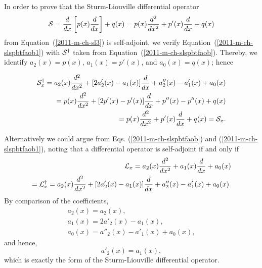 {\color{OliveGreen}
\bproof

In order to prove that the  Sturm-Liouville differential operator
\begin{equation}
\begin{split}
{\cal S}
=       \frac{d}{dx}
\left[
p(x)
\frac{d}{dx}
\right]
+
q(x)
= p(x) \frac{d^2}{dx^2}
+p'(x) \frac{d}{dx}
+q(x)
\end{split}
\label{2011-m-ch-slspbtfaoc}
\end{equation}
from Equation~(\ref{2011-m-ch-sl3})
is self-adjoint, we verify
Equation~(\ref{2011-m-ch-slspbtfaob1})
with
${\cal S}^\dagger$
taken from
Equation~(\ref{2011-m-ch-slspbtfaob}).
Thereby, we identify
$a_2(x) = p(x)$,
$a_1(x) = p'(x)$,
and
$a_0(x) = q(x)$; hence

\begin{equation}
\begin{split}
{\cal S}_x^\dagger
=a_2(x) \frac{d^2}{dx^2}
+
[2 a'_2(x)- a_1(x) ]  \frac{d}{dx}
+ a''_2(x)   - a'_1(x)   + a_0(x) \\
  =
p(x)  \frac{d^2}{dx^2}
+ [2 p'(x)-p'(x)] \frac{d}{dx}
+p''(x)-p''(x)+q(x) \\
  =
p(x)  \frac{d^2}{dx^2}
+ p'(x) \frac{d}{dx}
+q(x)  = {\cal S}_x
.
\end{split}
\end{equation}

Alternatively we could argue from Eqs. (\ref{2011-m-ch-slspbtfaob}) and (\ref{2011-m-ch-slspbtfaob1}),
noting that
a differential operator is self-adjoint if and only if
\begin{equation}
\begin{split}
 {\cal L}_x
=a_2(x) \frac{d^2}{dx^2}   +  a_1(x)\frac{d }{dx }    + a_0(x) \\
=   {\cal L}_x^\dagger =
 a_2(x) \frac{d^2}{dx^2}
+
[2 a'_2(x)- a_1(x) ]  \frac{d}{dx}
+ a''_2(x)   - a'_1(x)   + a_0(x)
.
\end{split}
\end{equation}
By comparison of the coefficients,
\begin{equation}
\begin{split}
a_2(x)=a_2(x),\\
a_1(x) =
2 a'_2(x)- a_1(x)   ,\\
a_0(x) =
 a''_2(x)   - a'_1(x)   + a_0(x)
,
\end{split}
\end{equation}
and hence,
\begin{equation}
 a'_2(x)= a_1(x),
\end{equation}
which is exactly the form of the   Sturm-Liouville differential operator.

\eproof
}

